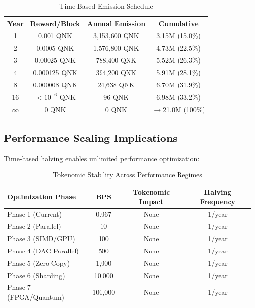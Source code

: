 \documentclass[11pt,a4paper]{article}
\begin{document}
\begin{table}[H]
\centering
\caption{Time-Based Emission Schedule}
\begin{tabular}{|c|c|c|c|}
\hline
\textbf{Year} & \textbf{Reward/Block} & \textbf{Annual Emission} & \textbf{Cumulative} \\
\hline
1 & 0.001 QNK & 3,153,600 QNK & 3.15M (15.0\%) \\
2 & 0.0005 QNK & 1,576,800 QNK & 4.73M (22.5\%) \\
3 & 0.00025 QNK & 788,400 QNK & 5.52M (26.3\%) \\
4 & 0.000125 QNK & 394,200 QNK & 5.91M (28.1\%) \\
8 & 0.000008 QNK & 24,638 QNK & 6.70M (31.9\%) \\
16 & $<10^{-6}$ QNK & 96 QNK & 6.98M (33.2\%) \\
$\infty$ & 0 QNK & 0 QNK & $\rightarrow$21.0M (100\%) \\
\hline
\end{tabular}
\label{tab:emission-schedule}
\end{table}

\subsection{Performance Scaling Implications}

Time-based halving enables unlimited performance optimization:

\begin{table}[H]
\centering
\caption{Tokenomic Stability Across Performance Regimes}
\begin{tabular}{|l|c|c|c|}
\hline
\textbf{Optimization Phase} & \textbf{BPS} & \textbf{Tokenomic Impact} & \textbf{Halving Frequency} \\
\hline
Phase 1 (Current) & 0.067 & None & 1/year \\
Phase 2 (Parallel) & 10 & None & 1/year \\
Phase 3 (SIMD/GPU) & 100 & None & 1/year \\
Phase 4 (DAG Parallel) & 500 & None & 1/year \\
Phase 5 (Zero-Copy) & 1,000 & None & 1/year \\
Phase 6 (Sharding) & 10,000 & None & 1/year \\
Phase 7 (FPGA/Quantum) & 100,000 & None & 1/year \\
\hline
\end{tabular}
\label{tab:performance-tokenomics}
\end{table}
\end{document}
